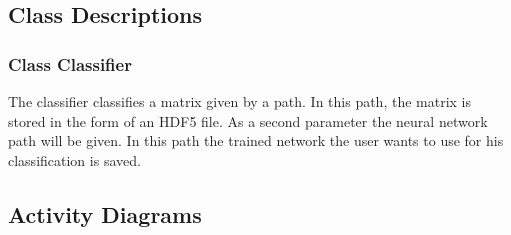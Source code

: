 \documentclass[parskip=full]{scrartcl}
\begin{document}
\begin{figure}[h]
\begin{center}

\label{Class Diagram}
\end{center}
\end{figure}

\newpage


\subsection{Class Descriptions}

\subsubsection{Class Classifier}
The classifier classifies a matrix given by a path. 
In this path, the matrix is stored in the form of an HDF5 file.
As a second parameter the neural network path will be given. 
In this path the trained network the user wants to use for his classification is saved.

\newpage
 
\subsection{Activity Diagrams}
\end{document}
